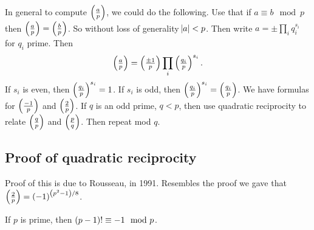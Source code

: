 In general to compute $ \jacobi{a}{p} $, we could do the following. Use that if $ a \equiv b \mod p $ then $ \jacobi{a}{p} = \jacobi{b}{p} $. So without loss of generality $ \abs{a} < p $. Then write $ a = \pm \prod_i q_i^{s_i} $ for $ q_i $ prime. Then
$$ \jacobi{a}{p} = \jacobi{\pm 1}{p} \prod_i \jacobi{q_i}{p}^{s_i}. $$
If $ s_i $ is even, then $ \jacobi{q_i}{p}^{s_i} = 1 $. If $ s_i $ is odd, then $ \jacobi{q_i}{p}^{s_i} = \jacobi{q_i}{p} $. We have formulas for $ \jacobi{-1}{p} $ and $ \jacobi{2}{p} $. If $ q $ is an odd prime, $ q < p $, then use quadratic reciprocity to relate $ \jacobi{q}{p} $ and $ \jacobi{p}{q} $. Then repeat mod $ q $.


\subsection{Proof of quadratic reciprocity}

Proof of this is due to Rousseau, in 1991. Resembles the proof we gave that $ \jacobi{2}{p} = \br{-1}^{\br{p^2 - 1} / 8} $.

\begin{theorem}
If $ p $ is prime, then $ \br{p - 1}! \equiv -1 \mod p $.
\end{theorem}

